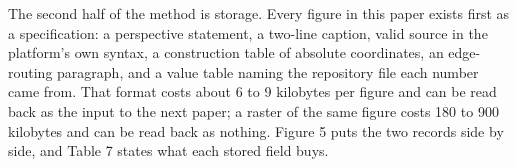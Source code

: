 \begin{appfloat}[!tb]
\begin{appfig}
\end{appfig}
\vspace{-0.6cm}
\end{appfloat}

The second half of the method is storage. Every figure in this paper exists
first as a specification: a perspective statement, a two-line caption, valid
source in the platform's own syntax, a construction table of absolute
coordinates, an edge-routing paragraph, and a value table naming the repository
file each number came from. That format costs about 6 to 9 kilobytes per figure
and can be read back as the input to the next paper; a raster of the same figure
costs 180 to 900 kilobytes and can be read back as nothing. Figure 5 puts the
two records side by side, and Table 7 states what each stored field buys.

